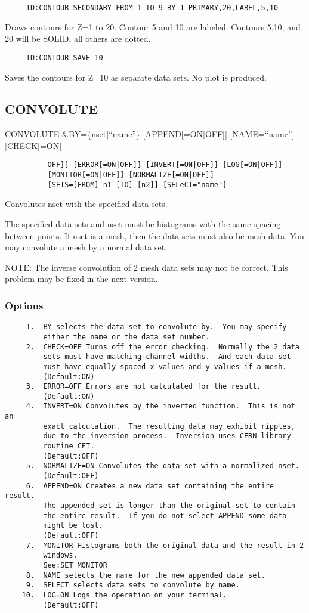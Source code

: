 \begin{verbatim}
     TD:CONTOUR SECONDARY FROM 1 TO 9 BY 1 PRIMARY,20,LABEL,5,10 
\end{verbatim}
Draws  contours for Z=1 to 20.  Contour 5 and 10 are labeled.  Contours
5,10, and 20 will be SOLID, all others are dotted.  
\begin{verbatim}
     TD:CONTOUR SAVE 10 
\end{verbatim}
Saves  the  contours  for  Z=10  as  separate  data  sets.   No plot is
produced.  
\subsection{CONVOLUTE}
CONVOLUTE \&BY=\{nset$|$``name''\} [APPEND[=ON$|$OFF]] [NAME=``name''] [CHECK[=ON$|$
\begin{verbatim}
          OFF]] [ERROR[=ON|OFF]] [INVERT[=ON|OFF]] [LOG[=ON|OFF]]
          [MONITOR[=ON|OFF]] [NORMALIZE[=ON|OFF]]
          [SETS=[FROM] n1 [TO] [n2]] [SELeCT="name"] 
\end{verbatim}
Convolutes nset with the specified data sets.  

The specified data sets and nset must be histograms with the same spacing
between points.  If nset is a mesh, then the data sets must also be mesh
data.  You may convolute a mesh by a normal data set.  

NOTE:  The inverse convolution of 2 mesh data sets may not be correct.
This problem may be fixed in the next version.  
\subsubsection{Options}
\begin{verbatim}
     1.  BY selects the data set to convolute by.  You may specify
         either the name or the data set number.  
     2.  CHECK=OFF Turns off the error checking.  Normally the 2 data
         sets must have matching channel widths.  And each data set
         must have equally spaced x values and y values if a mesh.  
         (Default:ON) 
     3.  ERROR=OFF Errors are not calculated for the result.  
         (Default:ON) 
     4.  INVERT=ON Convolutes by the inverted function.  This is not an
         exact calculation.  The resulting data may exhibit ripples,
         due to the inversion process.  Inversion uses CERN library
         routine CFT.  
         (Default:OFF) 
     5.  NORMALIZE=ON Convolutes the data set with a normalized nset.  
         (Default:OFF) 
     6.  APPEND=ON Creates a new data set containing the entire result.
         The appended set is longer than the original set to contain
         the entire result.  If you do not select APPEND some data
         might be lost.  
         (Default:OFF) 
     7.  MONITOR Histograms both the original data and the result in 2
         windows.  
         See:SET MONITOR 
     8.  NAME selects the name for the new appended data set.  
     9.  SELECT selects data sets to convolute by name.  
    10.  LOG=ON Logs the operation on your terminal.  
         (Default:OFF) 
\end{verbatim}
